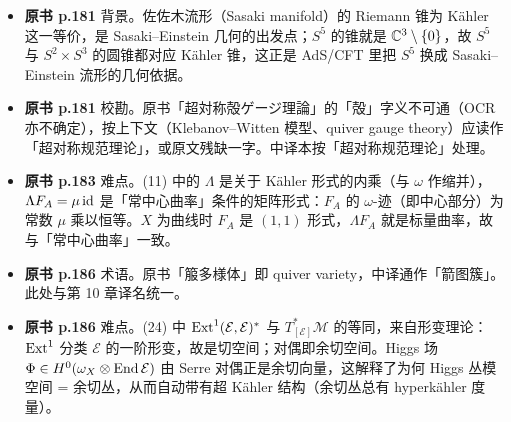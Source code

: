 \begin{itemize}[leftmargin=2.4em,itemsep=4pt,label={\textbullet}]
\item \textbf{原书 p.181} 背景。佐佐木流形（Sasaki manifold）的 Riemann 锥为 Kähler 这一等价，是 Sasaki–Einstein 几何的出发点；$S^5$ 的锥就是 $\mathbb{C}^3\setminus\{0\}$，故 $S^5$ 与 $S^2\times S^3$ 的圆锥都对应 Kähler 锥，这正是 AdS/CFT 里把 $S^5$ 换成 Sasaki–Einstein 流形的几何依据。
\item \textbf{原书 p.181} 校勘。原书「超対称殻ゲージ理論」的「殻」字义不可通（OCR 亦不确定），按上下文（Klebanov–Witten 模型、quiver gauge theory）应读作「超对称规范理论」，或原文残缺一字。中译本按「超对称规范理论」处理。
\item \textbf{原书 p.183} 难点。(11) 中的 $\Lambda$ 是关于 Kähler 形式的内乘（与 $\omega$ 作缩并），$\Lambda F_A=\mu\,\mathrm{id}$ 是「常中心曲率」条件的矩阵形式：$F_A$ 的 $\omega$-迹（即中心部分）为常数 $\mu$ 乘以恒等。$X$ 为曲线时 $F_A$ 是 $(1,1)$ 形式，$\Lambda F_A$ 就是标量曲率，故与「常中心曲率」一致。
\item \textbf{原书 p.186} 术语。原书「箙多様体」即 quiver variety，中译通作「箭图簇」。此处与第 10 章译名统一。
\item \textbf{原书 p.186} 难点。(24) 中 $\operatorname{Ext}^1(\mathcal{E},\mathcal{E})^*$ 与 $T^*_{[\mathcal{E}]}\mathcal{M}$ 的等同，来自形变理论：$\operatorname{Ext}^1$ 分类 $\mathcal{E}$ 的一阶形变，故是切空间；对偶即余切空间。Higgs 场 $\Phi\in H^0(\omega_X\otimes\operatorname{End}\mathcal{E})$ 由 Serre 对偶正是余切向量，这解释了为何 Higgs 丛模空间 = 余切丛，从而自动带有超 Kähler 结构（余切丛总有 hyperkähler 度量）。
\end{itemize}
